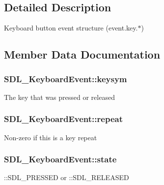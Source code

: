 \subsection{Detailed Description}
Keyboard button event structure (event.\+key.$\ast$) 

\subsection{Member Data Documentation}
\hypertarget{struct_s_d_l___keyboard_event_a2a57ba820a298f2c02ad5d41fd2b1aa8}{}
\subsubsection[{keysym}]{ S\+D\+L\+\_\+\+Keyboard\+Event\+::keysym}\label{struct_s_d_l___keyboard_event_a2a57ba820a298f2c02ad5d41fd2b1aa8}
The key that was pressed or released \hypertarget{struct_s_d_l___keyboard_event_a3edac3b36304812d533795c9df4ed4c1}{}
\subsubsection[{repeat}]{ S\+D\+L\+\_\+\+Keyboard\+Event\+::repeat}\label{struct_s_d_l___keyboard_event_a3edac3b36304812d533795c9df4ed4c1}
Non-\/zero if this is a key repeat \hypertarget{struct_s_d_l___keyboard_event_a110558eb96c113c86cfa31a7018c2346}{}
\subsubsection[{state}]{ S\+D\+L\+\_\+\+Keyboard\+Event\+::state}\label{struct_s_d_l___keyboard_event_a110558eb96c113c86cfa31a7018c2346}
\+::\+S\+D\+L\+\_\+\+P\+R\+E\+S\+S\+E\+D or \+::\+S\+D\+L\+\_\+\+R\+E\+L\+E\+A\+S\+E\+D \hypertarget{struct_s_d_l___keyboard_event_ae0b2f2aace6f80c1f47e5a14350d409a}{}
